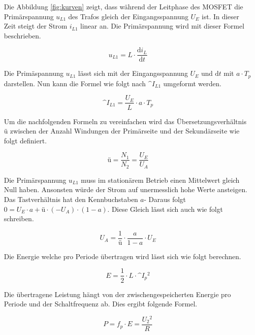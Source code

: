 Die Abbildung \ref{fig:kurven} zeigt, dass während der Leitphase des MOSFET die Primärspannung $ u_{L1} $ des Trafos gleich der Eingangsspannung $ U_{E} $ ist. In dieser Zeit steigt der Strom $ i_{L1} $ linear an. Die Primärspannung wird mit dieser Formel beschrieben.

\begin{equation}\label{eq:induktionsspannung}
u_{L1}=L \cdot \frac{\mathrm{d} i_{L}}{\mathrm{d} t}
\end{equation}

Die Primäspannung $ u_{L1} $ lässt sich mit der Eingangsspannung $ U_{E} $  und $ \mathrm{d} t $ mit $ a \cdot T_{p} $ darstellen. Nun kann die Formel wie folgt nach $ \^{I}_{L1} $ umgeformt werden.

\begin{equation}\label{eq:strom}
\^{I}_{L1}=\frac{U_{E}}{L}\cdot a \cdot T_{p}
\end{equation}

Um die nachfolgenden Formeln zu vereinfachen wird das Übersetzungsverhältnis $ ü $ zwischen der Anzahl Windungen der Primärseite und der Sekundärseite wie folgt definiert.

\begin{equation}\label{eq:übertragung}
ü= \frac{N_{1}}{N_{2}} = \frac{U_{E}}{U_{A}}
\end{equation}

Die Primärspannung $ u_{L1} $ muss im stationärem Betrieb einen Mittelwert gleich Null haben. Ansonsten würde der Strom auf unermesslich hohe Werte ansteigen. Das Tastverhältnis hat den Kennbuchstaben $ a $- Daraus folgt $ 0= U_{E} \cdot a + ü \cdot (-U_{A}) \cdot (1-a) $. Diese Gleich lässt sich auch wie folgt schreiben.

\begin{equation}\label{eq:ausgangsspannung}
U_{A}= \frac{1}{ü} \cdot \frac{a}{1-a} \cdot U_{E}
\end{equation}

Die Energie welche pro Periode übertragen wird lässt sich wie folgt berechnen.

\begin{equation}\label{eq:energie}
E= \frac{1}{2} \cdot L \cdot \^{I}_{p}\!^{2}
\end{equation}

Die übertragene Leistung hängt von der zwischengespeicherten Energie pro Periode und der Schaltfrequenz ab. Dies ergibt folgende Formel.

\begin{equation}\label{eq:Leistung}
P= f_{p} \cdot E = \frac{U_{2}\!^{2}}{R}
\end{equation}


